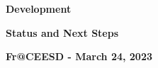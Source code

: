 \documentclass{beamer}
\begin{document}

\begin{frame}\frametitle{}
\vspace*{0.2in}
\centerline{\textrm{{\huge\bfseries\color{myOrange}\mirgecom{} Development}}}
\smallskip
\centerline{\textrm{{\small\bfseries\color{myOrange}Status and Next Steps}}}
\smallskip
\smallskip
\centerline{\textrm{{\large\bfseries{Fr@CEESD - March 24, 2023}}}}
\vspace*{0.2in}
\begin{center}
\vspace*{0.4in}
\end{center}
\end{frame}


\end{document}
